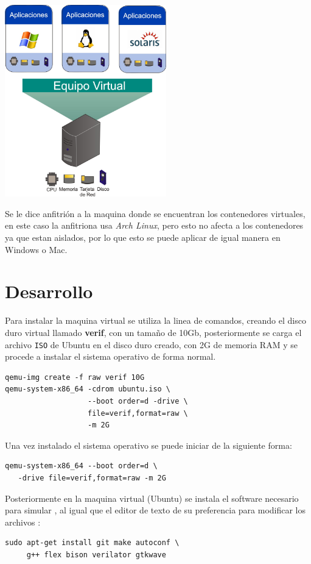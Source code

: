 \documentclass[11pt]{/home/hao/dev/org/latex-plantilla/IEEEtran}
\begin{document}
\begin{center}
\includegraphics[width=7cm]{virtualizacion.jpg}
\end{center}

Se le dice anfitrión a la maquina donde se encuentran los
contenedores virtuales, en este caso la anfitriona usa \emph{Arch
Linux}, pero esto no afecta a los contenedores ya que estan
aislados, por lo que esto se puede aplicar de igual manera en
Windows o Mac.
\section{Desarrollo}
\label{sec:orge6e9afe}
Para instalar la maquina virtual se utiliza la linea de comandos,
creando el disco duro virtual llamado \textbf{verif}, con un tamaño de
10Gb, posteriormente se carga el archivo \texttt{ISO} de Ubuntu en el disco
duro creado, con 2G de memoria RAM y se procede a instalar el
sistema operativo de forma normal.

\begin{verbatim}
qemu-img create -f raw verif 10G
qemu-system-x86_64 -cdrom ubuntu.iso \
                   --boot order=d -drive \
                   file=verif,format=raw \
                   -m 2G
\end{verbatim}

\newpage
Una vez instalado el sistema operativo se puede iniciar de la
siguiente forma:

\begin{verbatim}
qemu-system-x86_64 --boot order=d \
   -drive file=verif,format=raw -m 2G
\end{verbatim}

Posteriormente en la maquina virtual (Ubuntu) se instala el software
necesario para simular \cite{verilator-instalacion}, al igual que el
editor de texto de su preferencia para modificar los archivos :

\begin{verbatim}
sudo apt-get install git make autoconf \
     g++ flex bison verilator gtkwave
\end{verbatim}




\end{document}
